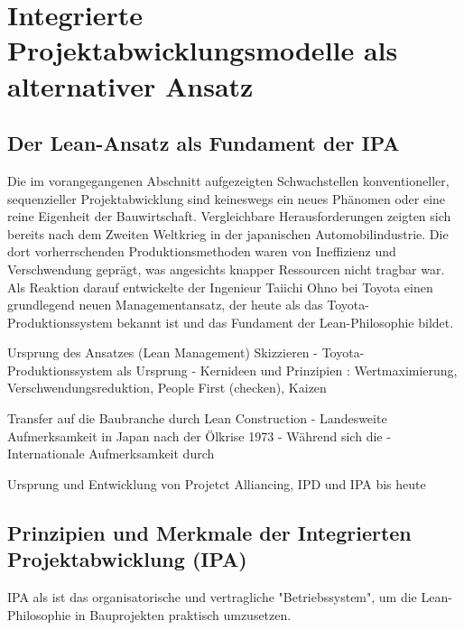 \clearpage

\section{Integrierte Projektabwicklungsmodelle als alternativer Ansatz}
\label{sec: 2.2}


\subsection{Der Lean-Ansatz als Fundament der \ac{IPA}}
\label{sec:2.2.1}


Die im vorangegangenen Abschnitt aufgezeigten Schwachstellen konventioneller, sequenzieller Projektabwicklung sind keineswegs ein neues Phänomen oder eine reine Eigenheit der Bauwirtschaft. Vergleichbare Herausforderungen zeigten sich bereits nach dem Zweiten Weltkrieg in der japanischen Automobilindustrie. Die dort vorherrschenden Produktionsmethoden waren von Ineffizienz und Verschwendung geprägt, was angesichts knapper Ressourcen nicht tragbar war. Als Reaktion darauf entwickelte der Ingenieur Taiichi Ohno bei Toyota einen grundlegend neuen Managementansatz, der heute als das Toyota-Produktionssystem bekannt ist und das Fundament der Lean-Philosophie bildet.

Ursprung des Ansatzes (Lean Management) Skizzieren
- Toyota-Produktionssystem\autocite[]{ohno_toyota-produktionssystem_2013} als Ursprung
- Kernideen und Prinzipien : Wertmaximierung, Verschwendungsreduktion, People First (checken), Kaizen

Transfer auf die Baubranche durch Lean Construction
- Landesweite Aufmerksamkeit in Japan nach der Ölkrise 1973
- Während sich die 
- Internationale Aufmerksamkeit durch 

Ursprung und Entwicklung von Projetct Alliancing, IPD und IPA bis heute

\subsection{Prinzipien und Merkmale der Integrierten Projektabwicklung (IPA)}
\label{sec:2.2.2}

IPA als ist das organisatorische und vertragliche "Betriebssystem", um die Lean-Philosophie in Bauprojekten praktisch umzusetzen.\\


